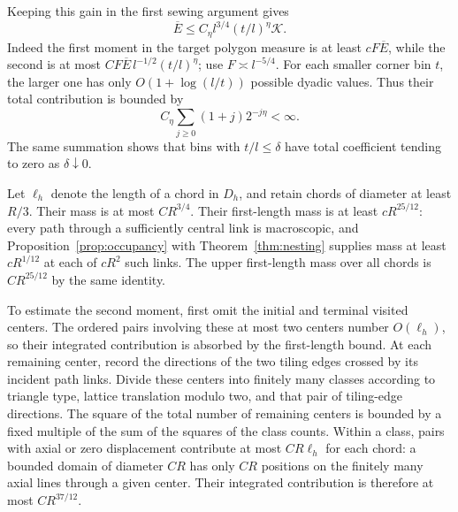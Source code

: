 Keeping this gain in the first sewing argument gives
\begin{equation}\label{eq:sewing-corner-gain}
 \overline E\le C_\eta l^{3/4}(t/l)^\eta\mathcal K.
\end{equation}
Indeed the first moment in the target polygon measure is at least $cF\overline E$, while the second is at most
$CF\overline E\,l^{-1/2}(t/l)^\eta$; use $F\asymp l^{-5/4}$. For each smaller corner bin $t$, the larger one has only $O(1+\log(l/t))$ possible dyadic values. Thus their total contribution is bounded by
\[
 C_\eta\sum_{j\ge0}(1+j)2^{-j\eta}<\infty.
\]
The same summation shows that bins with $t/l\le\delta$ have total coefficient tending to zero as $\delta\downarrow0$.

Let $\ell_h$ denote the length of a chord in $D_h$, and retain chords of diameter at least $R/3$. Their mass is at most $CR^{3/4}$. Their first-length mass is at least $cR^{25/12}$: every path through a sufficiently central link is macroscopic, and Proposition~\ref{prop:occupancy} with Theorem~\ref{thm:nesting} supplies mass at least $cR^{1/12}$ at each of $cR^2$ such links. The upper first-length mass over all chords is $CR^{25/12}$ by the same identity.

To estimate the second moment, first omit the initial and terminal visited centers. The ordered pairs involving these at most two centers number $O(\ell_h)$, so their integrated contribution is absorbed by the first-length bound. At each remaining center, record the directions of the two tiling edges crossed by its incident path links. Divide these centers into finitely many classes according to triangle type, lattice translation modulo two, and that pair of tiling-edge directions. The square of the total number of remaining centers is bounded by a fixed multiple of the sum of the squares of the class counts. Within a class, pairs with axial or zero displacement contribute at most $CR\ell_h$ for each chord: a bounded domain of diameter $CR$ has only $CR$ positions on the finitely many axial lines through a given center. Their integrated contribution is therefore at most $CR^{37/12}$.

